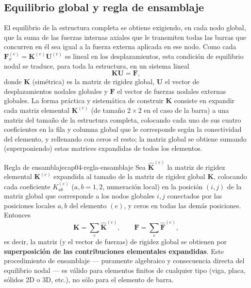 \subsection{Equilibrio global y regla de ensamblaje}

El equilibrio de la estructura completa se obtiene exigiendo, en cada nodo global, que la suma de las fuerzas internas axiales que le transmiten todas las barras que concurren en él sea igual a la fuerza externa aplicada en ese nodo. Como cada $\mathbf{F}_\sigma^{(e)} = \mathbf{K}^{(e)}\mathbf{U}^{(e)}$ es lineal en los desplazamientos, esta condición de equilibrio nodal se traduce, para toda la estructura, en un sistema lineal
\[
\mathbf{K}\mathbf{U} = \mathbf{F},
\]
donde $\mathbf{K}$ (simétrica) es la matriz de rigidez global, $\mathbf{U}$ el vector de desplazamientos nodales globales y $\mathbf{F}$ el vector de fuerzas nodales externas globales. La forma práctica y sistemática de construir $\mathbf{K}$ consiste en expandir cada matriz elemental $\mathbf{K}^{(e)}$ (de tamaño $2\times2$ en el caso de la barra) a una matriz del tamaño de la estructura completa, colocando cada uno de sus cuatro coeficientes en la fila y columna global que le corresponde según la conectividad del elemento, y rellenando con ceros el resto; la matriz global se obtiene sumando (superponiendo) estas matrices expandidas de todos los elementos.

\begin{ecnimportante}{Regla de ensamblaje}{cap04-regla-ensamblaje}
Sea $\widehat{\mathbf{K}}^{(e)}$ la matriz de rigidez elemental $\mathbf{K}^{(e)}$ expandida al tamaño de la matriz de rigidez global $\mathbf{K}$, colocando cada coeficiente $K^{(e)}_{ab}$ ($a,b=1,2$, numeración local) en la posición $(i,j)$ de la matriz global que corresponde a los nodos globales $i,j$ conectados por las posiciones locales $a,b$ del elemento $(e)$, y ceros en todas las demás posiciones. Entonces
\[
\mathbf{K} = \sum_{e} \widehat{\mathbf{K}}^{(e)}, \qquad \mathbf{F} = \sum_e \widehat{\mathbf{F}}^{(e)},
\]
es decir, la matriz (y el vector de fuerzas) de rigidez global se obtienen por \textbf{superposición de las contribuciones elementales expandidas}. Este procedimiento de ensamblaje --- puramente algebraico y consecuencia directa del equilibrio nodal --- es válido para elementos finitos de cualquier tipo (viga, placa, sólidos 2D o 3D, etc.), no sólo para el elemento de barra.
\end{ecnimportante}

